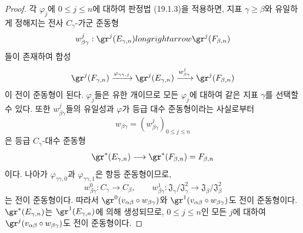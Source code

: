 \begin{proof}
각 $\varphi_j$에 $0\leq j\leq n$에 대하여 판정법 (19.1.3)을
적용하면, 지표 $\gamma\geq\beta$와 유일하게 정해지는 전사
$C_\gamma$-가군 준동형
\[
  w_{\beta\gamma}^j:\gr^j(E_{\gamma,n})longrightarrow
  \gr^j(F_{\beta,n})
\]
들이 존재하여 합성
\[
  \gr^j(F_{\gamma,n})
  \xrightarrow{\varphi_{\gamma\gamma,j}}\gr^j(E_{\gamma,n})
  \xrightarrow{w_{\beta\gamma}^j}\gr^j(F_{\beta,n})
\]
이 전이 준동형이 된다. $\varphi_j$들은 유한 개이므로 모든
$\varphi_j$에 대하여 같은 지표 $\gamma$를 선택할 수 있다. 또한
$w_{\beta\gamma}^j$들의 유일성과 $\varphi$가 등급 대수 준동형이라는
사실로부터
\[
  w_{\beta\gamma}=(w_{\beta\gamma}^j)_{0\leq j\leq n}
\]
은 등급 $C_\gamma$-대수 준동형
\[
  \gr^*(E_{\gamma,n})\longrightarrow
  \gr^*(F_{\beta,n})=F_{\beta,n}
\]
이다. 나아가 $\varphi_{\gamma\gamma,0}$과
$\varphi_{\gamma\gamma,1}$은 항등 준동형이므로,
\[
  w_{\beta\gamma}^0:C_\gamma\longrightarrow C_\beta,
  \qquad
  w_{\beta\gamma}^1:
  \mathfrak J_\gamma/\mathfrak J_\gamma^2\longrightarrow
  \mathfrak J_\beta/\mathfrak J_\beta^2
\]
는 전이 준동형이다. 따라서
$\gr^0(v_{\alpha\beta}\circ w_{\beta\gamma})$와
$\gr^1(v_{\alpha\beta}\circ w_{\beta\gamma})$도 전이 준동형이다.
$\gr^*(E_{\gamma,n})$는 $\gr^1(E_{\gamma,n})$에 의해 생성되므로,
$0\leq j\leq n$인 모든 $j$에 대하여
$\gr^j(v_{\alpha\beta}\circ w_{\beta\gamma})$도 전이 준동형이다.


\end{proof}
